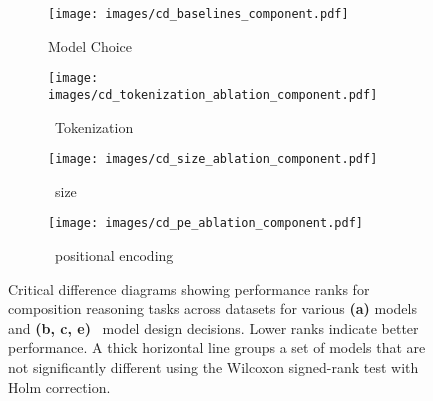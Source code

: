 \begin{figure}[htbp]
    \centering
    \begin{subfigure}[b]{0.495\textwidth}
        \centering
        \texttt{[image: images/cd\_baselines\_component.pdf]}
        \caption{Model Choice}
        \label{fig:cd_baselines_component_main}
    \end{subfigure}

    \vspace{1em}

    \begin{subfigure}[b]{0.495\textwidth}
        \centering
        \texttt{[image: images/cd\_tokenization\_ablation\_component.pdf]}
        \caption{\Tfive\ Tokenization}
        \label{fig:cd_tokenization_ablation_component_main}
    \end{subfigure}

    \vspace{1em}

    \begin{subfigure}[b]{0.495\textwidth}
        \centering
        \texttt{[image: images/cd\_size\_ablation\_component.pdf]}
        \caption{\Tfive\ size}
        \label{fig:cd_size_ablation_component_main}
    \end{subfigure}

    \vspace{1em}

    \begin{subfigure}[b]{0.495\textwidth}
        \centering
        \texttt{[image: images/cd\_pe\_ablation\_component.pdf]}
        \caption{\Tfive\ positional encoding}
        \label{fig:cd_pe_ablation_component_main}
    \end{subfigure}
    
    \caption{Critical difference diagrams showing performance ranks for composition reasoning tasks across datasets for various \textbf{(a)} models and \textbf{(b, c, e)} \Tfive\ model design decisions. Lower ranks indicate better performance. A thick horizontal line groups a set of models that are not significantly different using the Wilcoxon signed-rank test with Holm correction.}
    \label{fig:main_comparison}
\end{figure}
